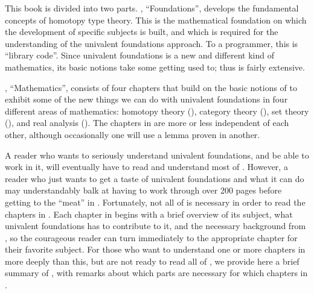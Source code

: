 \documentclass[12pt]{article}
\begin{document}
This book is divided into two parts.
, ``Foundations'', develops the fundamental concepts of homotopy type theory.
This is the mathematical foundation on which the development of specific subjects is built, and which is required for the understanding of the univalent foundations approach. To a programmer, this is ``library code''.
Since univalent foundations is a new and different kind of mathematics, its basic notions take some getting used to; thus  is fairly extensive.

, ``Mathematics'', consists of four chapters that build on the basic notions of  to exhibit some of the new things we can do with univalent foundations in four different areas of mathematics: homotopy theory (), category theory (), set theory (), and real analysis ().
The chapters in  are more or less independent of each other, although occasionally one will use a lemma proven in another.

A reader who wants to seriously understand univalent foundations, and be able to work in it, will eventually have to read and understand most of .
However, a reader who just wants to get a taste of univalent foundations and what it can do may understandably balk at having to work through over 200 pages before getting to the ``meat'' in .
Fortunately, not all of  is necessary in order to read the chapters in .
Each chapter in  begins with a brief overview of its subject, what univalent foundations has to contribute to it, and the necessary background from , so the courageous reader can turn immediately to the appropriate chapter for their favorite subject.
For those who want to understand one or more chapters in  more deeply than this, but are not ready to read all of , we provide here a brief summary of , with remarks about which parts are necessary for which chapters in .
\end{document}
